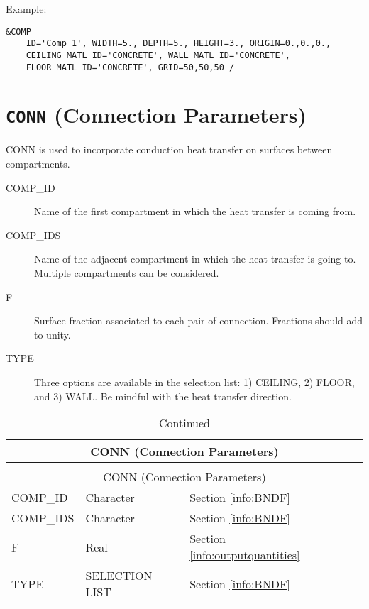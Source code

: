\noindent Example:
\begin{lstlisting}
&COMP 
	ID='Comp 1', WIDTH=5., DEPTH=5., HEIGHT=3., ORIGIN=0.,0.,0., 
	CEILING_MATL_ID='CONCRETE', WALL_MATL_ID='CONCRETE', 
	FLOOR_MATL_ID='CONCRETE', GRID=50,50,50 /
\end{lstlisting}

\vspace{\baselineskip}


\section{\texorpdfstring{{\tt CONN}}{CONN} (Connection Parameters)}

CONN is used to incorporate conduction heat transfer on surfaces between compartments.

\begin{adjustwidth}{1cm}{0cm}
\begin{description}
  \item[COMP\_ID] Name of the first compartment in which the heat transfer is coming from.
  \item[COMP\_IDS] Name of the adjacent compartment in which the heat transfer is going to. Multiple compartments can be considered.
  \item[F] Surface fraction associated to each pair of connection. Fractions should add to unity.
  \item[TYPE] Three options are available in the selection list: 1) CEILING, 2) FLOOR, and 3) WALL. Be mindful with the heat transfer direction.
\end{description}
\end{adjustwidth}

\vspace{\baselineskip}

\begin{longtable}{@{\extracolsep{\fill}}|l|l|l|l|l|}
\caption[Boundary file parameters ({\ct CONN} namelist group)]{For more information see Section~\ref{info:BNDF}.}
\label{tbl:CONN} \\
\hline
\multicolumn{5}{|c|}{{\ct CONN} (Connection Parameters)} \\
\hline \hline
\endfirsthead
\caption[]{Continued} \\
\hline
\multicolumn{5}{|c|}{{\ct CONN} (Connection Parameters)} \\
\hline \hline
\endhead
{\ct COMP\_ID}              & Character & Section \ref{info:BNDF}                 &           &  		\\ \hline
{\ct COMP\_IDS}              & Character & Section \ref{info:BNDF}                 &           &  		\\ \hline
{\ct F}             & Real      & Section \ref{info:outputquantities}     &           &                 \\ \hline
{\ct TYPE}        	    & {\ct SELECTION LIST} & Section \ref{info:BNDF}                 &           &                 \\ \hline
\end{longtable}


